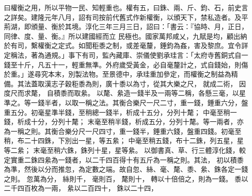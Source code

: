 \begin{pinyinscope}
曰權衡之用，所以平物一民、知輕重也。權有五，曰銖、兩、斤、鈞、石，前史言之詳矣。建隆元年八月，詔有司按前代舊式作新權衡，以頒天下，禁私造者。及平荊湖，即頒量、衡於其境。淳化三年三月三日，詔曰：「書云：『協時、月，正日，同律、度、量、衡。』所以建國經而立
 民極也。國家萬邦咸乂，九賦是均，顧出納於有司，繫權衡之定式。如聞秬黍之制，或差毫釐，錘鈞為姦，害及黎庶。宜令詳定稱法，著為通規。」事下有司，監內藏庫、崇儀使劉承珪言：「太府寺舊銅式自一錢至十斤，凡五十一，輕重無準。外府歲受黃金，必自毫釐計之，式自錢始，則傷於重。」遂尋究本末，別製法物。至景德中，承珪重加參定，而權衡之制益為精備。其法蓋取漢志子穀秬黍為則，廣十黍以為寸，從其大樂之尺，
 就成二術，
 因度尺而求氂，
 自積黍而取絫。
 以氂、絫造一錢半及一兩等二稱，各懸三毫，以星準之。等一錢半者，以取一稱之法。其衡合樂尺一尺二寸，重一錢，錘重六分，盤重五分。初毫星準半錢，至稍總一錢半，析成十五分，分列十氂；
 中毫至稍一錢，析成十分，分列十氂；
 末毫至稍半錢，析成五分，分列十氂。等一兩者，亦為一稱之則。其衡合樂分尺一尺四寸，重一錢半，錘重六錢，盤重四錢。初毫至稍，布二十四銖，下別出一星，等五絫；
 中毫至稍五錢，布十二銖，列五星，星等二絫；
 末毫至稍六銖，銖列十星，星等絫。
 以御書真、草、行三體淳化錢，較定實重二銖四絫為一錢者，以二千四百得十有五斤為一稱之則。其法，
 初以積黍為準，然後以分而推忽，為定數之端。故自忽、絲、毫、氂、黍、絫、銖各定一錢之則。
 忽萬為分，
 絲則千，
 毫則百，
 氂則十，
 轉以十倍倍之，則為一錢。
 黍以二千四百枚為一兩，
 絫以二百四十，
 銖以二十四，
 \gezhu{
}
\end{pinyinscope}
